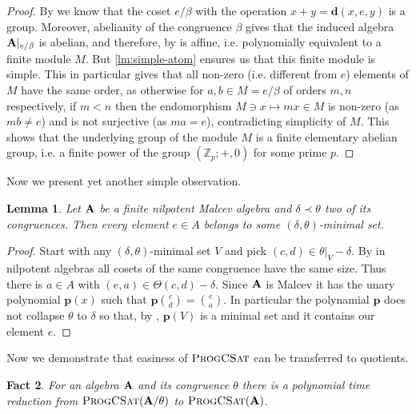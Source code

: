 \documentclass[11pt,a4paper]{amsart}
\newtheorem{lm}{Lemma}[section]
\newtheorem{fact}[lm]{Fact}
\newcommand{\m}[1]{{\uppercase {\bf{#1}}}}
\newcommand{\vpair}[2]{{{#1}\choose{#2}}}
\renewcommand{\mapsto}{\longmapsto}
\newcommand{\po}[1]{{\mathbf {#1}}}
\newcommand{\gProblem}[2]{\ensuremath{\operatorname{\textup{\textsc{{#2}}}}
		\ifthenelse{\equal{#1}{}}{}{\!\left( {#1} \right)}}}
\newcommand{\progcsat}[1]{\gProblem{#1}{ProgCSat}}
\newcommand{\setm}{-}
\newcommand{\z}{\mathbb{Z}}
\newcommand{\zero}{e}
\begin{document}
\begin{proof}
By \cite[Corollary 5.8]{fm} we know that the coset $\zero/\beta$ with the operation
$x+y=\po d(x,\zero,y)$ is a group.
Moreover, abelianity of the congruence $\beta$ gives that the induced algebra $\m A|_{\zero/\beta}$ is abelian, and therefore, by \cite[Corollary 5.9]{fm} is affine,
i.e. polynomially equivalent to a finite module $M$.
But \cref{lm:simple-atom} ensures us that this finite module is simple.
This in particular gives that all non-zero (i.e. different from $\zero$) elements of $M$ have the same order, as otherwise for $a,b\in M=\zero/\beta$ of orders $m,n$ respectively,
if $m<n$ then the endomorphism $M\ni x \mapsto mx\in M$ is non-zero (as $mb\neq \zero$)
and is not surjective (as $ma=\zero$), contradicting simplicity of $M$.
This shows that the underlying group of the module $M$ is a finite elementary abelian group,
i.e. a finite power of the group $(\z_p;+,0)$ for some prime $p$.
\end{proof}

Now we present yet another simple observation.


\begin{lm}
\label{lm:minset}
Let $\m A$ be a finite nilpotent Malcev algebra
and $\delta\prec\theta$ two of its congruences.
Then every element $e\in A$ belongs to some $(\delta,\theta)$-minimal set.
\end{lm}

\begin{proof}
Start with any $(\delta,\theta)$-minimal set $V$ and pick $(c,d)\in\theta|_V\setm\delta$.
By \cite[Corollary 7.5]{fm} in nilpotent algebras all cosets of the same congruence have the same size. Thus there is $a \in A$ with $(e,a)\in \Theta(c,d)\setm\delta$.
Since $\m A$ is Malcev it has the unary polynomial $\po p(x)$ such that
$\po p\vpair{c}{d} = \vpair{e}{a}$.
In particular the polynamial $\po p$ does not collapse $\theta$ to $\delta$
so that, by \cite[Lemma 2.8]{hm}, $\po p(V)$ is a minimal set and it contains our element $e$.
\end{proof}



Now we demonstrate that easiness of \progcsat{} can be transferred to quotients. 
\begin{fact}

\label{fact:quotient}
For an algebra $\m A$ and its congruence $\theta$
there is a polynomial time reduction from \progcsat{\m A/\theta} to \progcsat{\m A}.
\end{fact}
\end{document}
